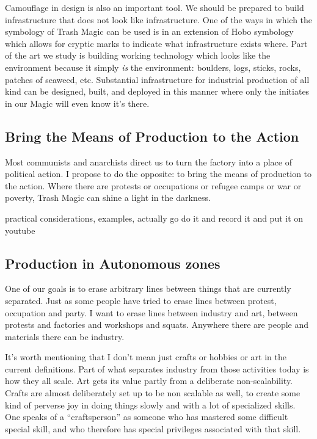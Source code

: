 Camouflage in design is also an important tool. We should be prepared to
build infrastructure that does not look like infrastructure. One of the
ways in which the symbology of Trash Magic can be used is in an
extension of Hobo symbology which allows for cryptic marks to indicate
what infrastructure exists where. Part of the art we study is building
working technology which looks like the environment because it simply
\emph{is} the environment: boulders, logs, sticks, rocks, patches of
seaweed, etc. Substantial infrastructure for industrial production of
all kind can be designed, built, and deployed in this manner where only
the initiates in our Magic will even know it's there.

\subsection{Bring the Means of Production to the
Action}\label{bring-the-means-of-production-to-the-action}

Most communists and anarchists direct us to turn the factory into a
place of political action. I propose to do the opposite: to bring the
means of production to the action. Where there are protests or
occupations or refugee camps or war or poverty, Trash Magic can shine a
light in the darkness.

practical considerations, examples, actually go do it and record it and
put it on youtube

\subsection{Production in Autonomous
zones}\label{production-in-autonomous-zones}

One of our goals is to erase arbitrary lines between things that are
currently separated. Just as some people have tried to erase lines
between protest, occupation and party. I want to erase lines between
industry and art, between protests and factories and workshops and
squats. Anywhere there are people and materials there can be industry.

It's worth mentioning that I don't mean just crafts or hobbies or art in
the current definitions. Part of what separates industry from those
activities today is how they all scale. Art gets its value partly from a
deliberate non-scalability. Crafts are almost deliberately set up to be
non scalable as well, to create some kind of perverse joy in doing
things slowly and with a lot of specialized skills. One speaks of a
``craftsperson'' as someone who has mastered some difficult special
skill, and who therefore has special privileges associated with that
skill.

